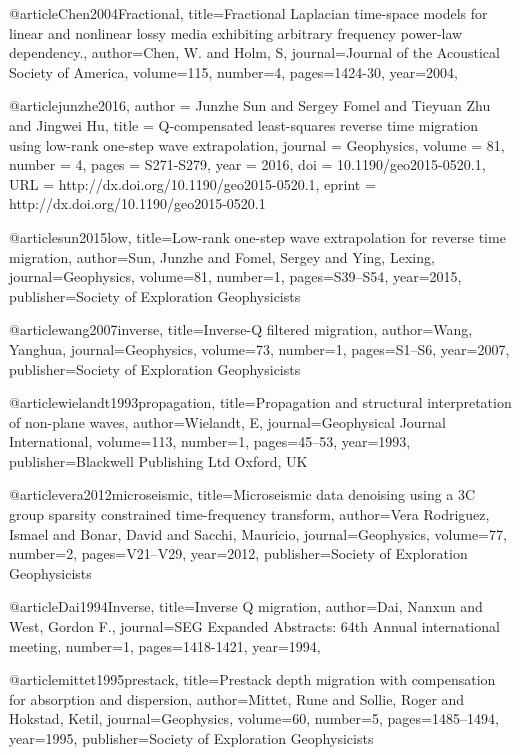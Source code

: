 @article{Chen2004Fractional,
  title={Fractional Laplacian time-space models for linear and nonlinear lossy media exhibiting arbitrary frequency power-law dependency.},
  author={Chen, W. and Holm, S},
  journal={Journal of the Acoustical Society of America},
  volume={115},
  number={4},
  pages={1424-30},
  year={2004},
}

@article{junzhe2016,
author = {Junzhe Sun and Sergey Fomel and Tieyuan Zhu and Jingwei Hu},
title = {Q-compensated least-squares reverse time migration using low-rank one-step wave extrapolation},
journal = {Geophysics},
volume = {81},
number = {4},
pages = {S271-S279},
year = {2016},
doi = {10.1190/geo2015-0520.1},
URL = {http://dx.doi.org/10.1190/geo2015-0520.1},
eprint = {http://dx.doi.org/10.1190/geo2015-0520.1}
}

@article{sun2015low,
  title={Low-rank one-step wave extrapolation for reverse time migration},
  author={Sun, Junzhe and Fomel, Sergey and Ying, Lexing},
  journal={Geophysics},
  volume={81},
  number={1},
  pages={S39--S54},
  year={2015},
  publisher={Society of Exploration Geophysicists}
}

@article{wang2007inverse,
  title={Inverse-{Q} filtered migration},
  author={Wang, Yanghua},
  journal={Geophysics},
  volume={73},
  number={1},
  pages={S1--S6},
  year={2007},
  publisher={Society of Exploration Geophysicists}
}


@article{wielandt1993propagation,
  title={Propagation and structural interpretation of non-plane waves},
  author={Wielandt, E},
  journal={Geophysical Journal International},
  volume={113},
  number={1},
  pages={45--53},
  year={1993},
  publisher={Blackwell Publishing Ltd Oxford, UK}
}



@article{vera2012microseismic,
  title={Microseismic data denoising using a 3C group sparsity constrained time-frequency transform},
  author={Vera Rodriguez, Ismael and Bonar, David and Sacchi, Mauricio},
  journal={Geophysics},
  volume={77},
  number={2},
  pages={V21--V29},
  year={2012},
  publisher={Society of Exploration Geophysicists}
}



@article{Dai1994Inverse,
  title={Inverse {Q} migration},
  author={Dai, Nanxun and West, Gordon F.},
  journal={SEG Expanded Abstracts: 64th Annual international meeting},
  number={1},
  pages={1418-1421},
  year={1994},
}

@article{mittet1995prestack,
  title={Prestack depth migration with compensation for absorption and dispersion},
  author={Mittet, Rune and Sollie, Roger and Hokstad, Ketil},
  journal={Geophysics},
  volume={60},
  number={5},
  pages={1485--1494},
  year={1995},
  publisher={Society of Exploration Geophysicists}
}

